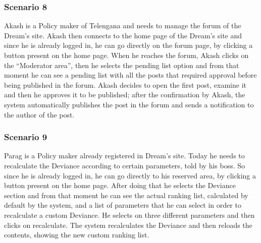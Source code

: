 \subsubsection*{Scenario 8}
Akash is a Policy maker of Telengana and needs to manage the forum of the Dream’s site. Akash then connects to the home page of the Dream’s site and since he is already logged in, he can go directly on the forum page, by clicking a button present on the home page. When he reaches the forum, Akash clicks on the “Moderator area”, then he selects the pending list option and from that moment he can see a pending list with all the posts that required approval before being published in the forum. Akash decides to open the first post, examine it and then he approves it to be published; after the confirmation by Akash, the system automatically publishes the post in the forum and sends a notification to the author of the post.

\subsubsection*{Scenario 9}
Parag is a Policy maker already registered in Dream’s site. Today he needs to recalculate the Deviance according to certain parameters, told by his boss. So since he is already logged in, he can go directly to his reserved area, by clicking a button present on the home page. After doing that he selects the Deviance section and from that moment he can see the actual ranking list, calculated by default by the system, and a list of parameters that he can select in order to recalculate a custom Deviance. He selects on three different parameters and then clicks on recalculate. The system recalculates the Deviance and then reloads the contents, showing the new custom ranking list.

